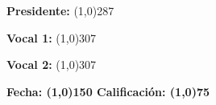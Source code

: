 \vspace{2.0cm}
\textbf{\Large Presidente:}{\Large{} \line(1,0){287}  }{\Large \par} %

\vspace{2.0cm}
\textbf{\Large Vocal 1:}{\Large{} \line(1,0){307}  }{\Large \par} %

\vspace{2.0cm}
\textbf{\Large Vocal 2:}{\Large{} \line(1,0){307}  }{\Large \par} %

\vspace{0.8cm}
\textbf{ Fecha: \line(1,0){150} \hspace{1cm}Calificación: \line(1,0){75}  }{ \par}



